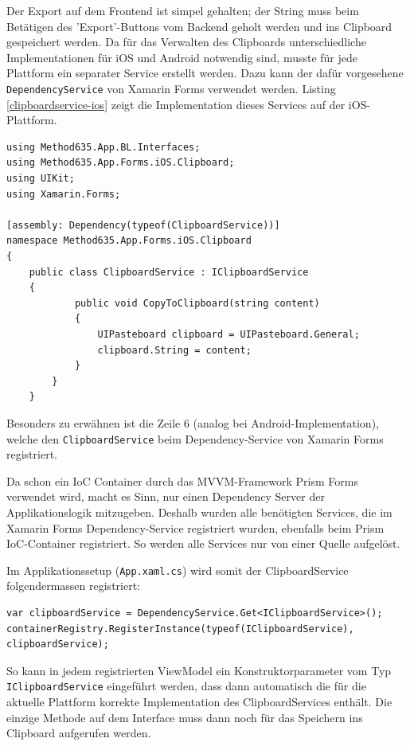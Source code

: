 Der Export auf dem Frontend ist simpel gehalten; der String muss beim Betätigen des 'Export'-Buttons vom Backend geholt werden und ins Clipboard gespeichert werden. Da für das Verwalten des Clipboards unterschiedliche Implementationen für iOS und Android notwendig sind, musste für jede Plattform ein separater Service erstellt werden. Dazu kann der dafür vorgesehene \texttt{DependencyService} von Xamarin Forms verwendet werden. Listing \ref{clipboardservice-ios} zeigt die Implementation dieses Services auf der iOS-Plattform.
\begin{lstlisting}[morekeywords={assembly,namespace,typeof,string}, label={clipboardservice-ios},caption={Clipboard Service auf iOS}]
using Method635.App.BL.Interfaces;
using Method635.App.Forms.iOS.Clipboard;
using UIKit;
using Xamarin.Forms;

[assembly: Dependency(typeof(ClipboardService))]
namespace Method635.App.Forms.iOS.Clipboard
{
	public class ClipboardService : IClipboardService
	{
			public void CopyToClipboard(string content)
			{
				UIPasteboard clipboard = UIPasteboard.General;
				clipboard.String = content;
			}
		}
	}
\end{lstlisting}
Besonders zu erwähnen ist die Zeile 6 (analog bei Android-Implementation), welche den \texttt{ClipboardService} beim Dependency-Service von Xamarin Forms registriert. 

Da schon ein IoC Container durch das MVVM-Framework Prism Forms verwendet wird, macht es Sinn, nur einen Dependency Server der Applikationslogik mitzugeben. Deshalb wurden alle benötigten Services, die im Xamarin Forms Dependency-Service registriert wurden, ebenfalls beim Prism IoC-Container registriert. So werden alle Services nur von einer Quelle aufgelöst.

Im Applikationssetup (\texttt{App.xaml.cs}) wird somit der ClipboardService folgendermassen registriert:
\begin{lstlisting}
var clipboardService = DependencyService.Get<IClipboardService>();
containerRegistry.RegisterInstance(typeof(IClipboardService), clipboardService);
\end{lstlisting}
So kann in jedem registrierten ViewModel ein Konstruktorparameter vom Typ \texttt{IClipboard\-Service} eingeführt werden, dass dann automatisch die für die aktuelle Plattform korrekte Implementation des ClipboardServices enthält. Die einzige Methode auf dem Interface muss dann noch für das Speichern ins Clipboard aufgerufen werden. 


